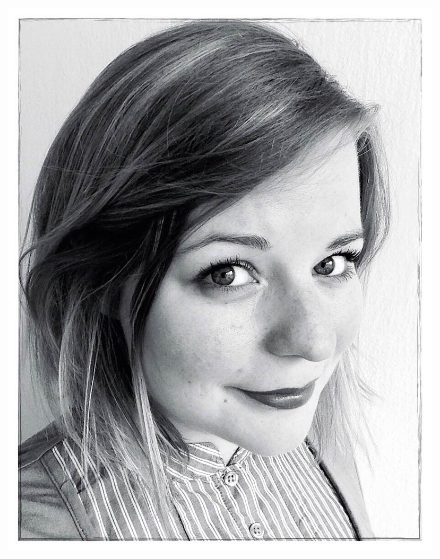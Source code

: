 \documentclass{mycv}
\begin{document}
\begin{paracol}{3}


  \begin{figure}[h!]
    \centering
    \includegraphics[width=0.9\linewidth]{img/anna3.jpg}
  \end{figure}

  \vspace{1cm}


\end{paracol}
\end{document}
